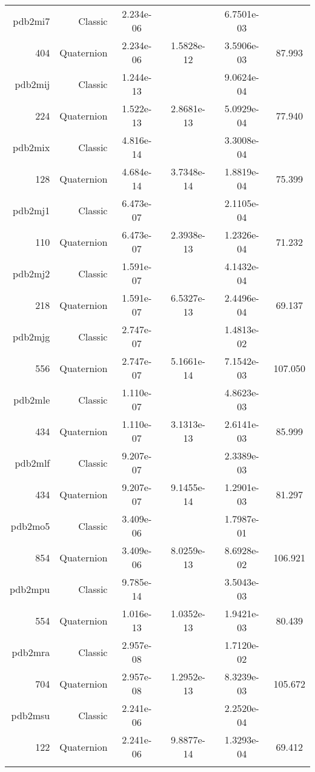 \begin{xltabular}{\textwidth}{r|rS[table-format=1.3e+2]S[table-format=1.4e+2]S[table-format=1.4e+2]S[table-format=-1.3]}
pdb2mi7 & Classic & 2.234e-06 &  & 6.7501e-03 & \\
404 & Quaternion & 2.234e-06 & 1.5828e-12 & 3.5906e-03 & 87.993\\  \addlinespace
pdb2mij & Classic & 1.244e-13 &  & 9.0624e-04 & \\
224 & Quaternion & 1.522e-13 & 2.8681e-13 & 5.0929e-04 & 77.940\\  \addlinespace
pdb2mix & Classic & 4.816e-14 &  & 3.3008e-04 & \\
128 & Quaternion & 4.684e-14 & 3.7348e-14 & 1.8819e-04 & 75.399\\  \addlinespace
pdb2mj1 & Classic & 6.473e-07 &  & 2.1105e-04 & \\
110 & Quaternion & 6.473e-07 & 2.3938e-13 & 1.2326e-04 & 71.232\\  \addlinespace
pdb2mj2 & Classic & 1.591e-07 &  & 4.1432e-04 & \\
218 & Quaternion & 1.591e-07 & 6.5327e-13 & 2.4496e-04 & 69.137\\  \addlinespace
pdb2mjg & Classic & 2.747e-07 &  & 1.4813e-02 & \\
556 & Quaternion & 2.747e-07 & 5.1661e-14 & 7.1542e-03 & 107.050\\  \addlinespace
pdb2mle & Classic & 1.110e-07 &  & 4.8623e-03 & \\
434 & Quaternion & 1.110e-07 & 3.1313e-13 & 2.6141e-03 & 85.999\\  \addlinespace
pdb2mlf & Classic & 9.207e-07 &  & 2.3389e-03 & \\
434 & Quaternion & 9.207e-07 & 9.1455e-14 & 1.2901e-03 & 81.297\\  \addlinespace
pdb2mo5 & Classic & 3.409e-06 &  & 1.7987e-01 & \\
854 & Quaternion & 3.409e-06 & 8.0259e-13 & 8.6928e-02 & 106.921\\  \addlinespace
pdb2mpu & Classic & 9.785e-14 &  & 3.5043e-03 & \\
554 & Quaternion & 1.016e-13 & 1.0352e-13 & 1.9421e-03 & 80.439\\  \addlinespace
pdb2mra & Classic & 2.957e-08 &  & 1.7120e-02 & \\
704 & Quaternion & 2.957e-08 & 1.2952e-13 & 8.3239e-03 & 105.672\\  \addlinespace
pdb2msu & Classic & 2.241e-06 &  & 2.2520e-04 & \\
122 & Quaternion & 2.241e-06 & 9.8877e-14 & 1.3293e-04 & 69.412\\  \addlinespace

\end{xltabular}
